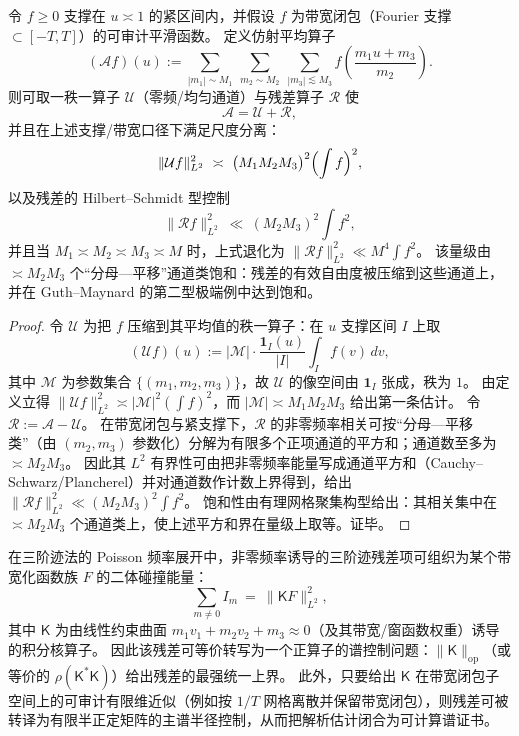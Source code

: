 \begin{proposition}\label{prop:gm-affine-average-rank1-residual}
令 \(f\ge 0\) 支撑在 \(u\asymp 1\) 的紧区间内，并假设 \(f\) 为带宽闭包（Fourier 支撑 \(\subset[-T,T]\)）的可审计平滑函数。
定义仿射平均算子
\[
(\mathcal{A}f)(u)
:=\sum_{|m_1|\sim M_1}\ \sum_{m_2\sim M_2}\ \sum_{|m_3|\lesssim M_3}
f\!\left(\frac{m_1u+m_3}{m_2}\right).
\]
则可取一秩一算子 \(\mathcal{U}\)（零频/均匀通道）与残差算子 \(\mathcal{R}\) 使
\[
\mathcal{A}=\mathcal{U}+\mathcal{R},
\]
并且在上述支撑/带宽口径下满足尺度分离：
\[
\|\mathcal{U}f\|_{L^2}^2\ \asymp\ \bigl(M_1M_2M_3\bigr)^2\Bigl(\int f\Bigr)^2,
\]
以及残差的 Hilbert--Schmidt 型控制
\[
\|\mathcal{R}f\|_{L^2}^2\ \ll\ (M_2M_3)^2\int f^2,
\]
并且当 \(M_1\asymp M_2\asymp M_3\asymp M\) 时，上式退化为 \(\|\mathcal{R}f\|_{L^2}^2\ll M^4\int f^2\)。
该量级由 \(\asymp M_2M_3\) 个“分母—平移”通道类饱和：残差的有效自由度被压缩到这些通道上，并在 Guth--Maynard 的第二型极端例中达到饱和。
\end{proposition}

\begin{proof}
令 \(\mathcal{U}\) 为把 \(f\) 压缩到其平均值的秩一算子：在 \(u\) 支撑区间 \(I\) 上取
\[
(\mathcal{U}f)(u):=\bigl|\mathcal{M}\bigr|\cdot \frac{\mathbf{1}_I(u)}{|I|}\int_I f(v)\,dv,
\]
其中 \(\mathcal{M}\) 为参数集合 \(\{(m_1,m_2,m_3)\}\)，故 \(\mathcal{U}\) 的像空间由 \(\mathbf{1}_I\) 张成，秩为 \(1\)。
由定义立得
\(\|\mathcal{U}f\|_{L^2}^2\asymp |\mathcal{M}|^2(\int f)^2\)，而 \(|\mathcal{M}|\asymp M_1M_2M_3\) 给出第一条估计。
令 \(\mathcal{R}:=\mathcal{A}-\mathcal{U}\)。
在带宽闭包与紧支撑下，\(\mathcal{R}\) 的非零频率相关可按“分母—平移类”（由 \((m_2,m_3)\) 参数化）分解为有限多个正项通道的平方和；通道数至多为 \(\asymp M_2M_3\)。
因此其 \(L^2\) 有界性可由把非零频率能量写成通道平方和（Cauchy--Schwarz/Plancherel）并对通道数作计数上界得到，给出
\(\|\mathcal{R}f\|_{L^2}^2\ll (M_2M_3)^2\int f^2\)。
饱和性由有理网格聚集构型给出：其相关集中在 \(\asymp M_2M_3\) 个通道类上，使上述平方和界在量级上取等。证毕。
\end{proof}

\begin{proposition}\label{prop:gm-trace3-poisson-collision-energy}
在三阶迹法的 Poisson 频率展开中，非零频率诱导的三阶迹残差项可组织为某个带宽化函数族 \(F\) 的二体碰撞能量：
\[
\sum_{m\ne 0} I_m\ =\ \|\mathsf{K}F\|_{L^2}^2,
\]
其中 \(\mathsf{K}\) 为由线性约束曲面 \(m_1v_1+m_2v_2+m_3\approx 0\)（及其带宽/窗函数权重）诱导的积分核算子。
因此该残差可等价转写为一个正算子的谱控制问题：\(\|\mathsf{K}\|_{\mathrm{op}}\)（或等价的 \(\rho(\mathsf{K}^\ast\mathsf{K})\)）给出残差的最强统一上界。
此外，只要给出 \(\mathsf{K}\) 在带宽闭包子空间上的可审计有限维近似（例如按 \(1/T\) 网格离散并保留带宽闭包），则残差可被转译为有限半正定矩阵的主谱半径控制，从而把解析估计闭合为可计算谱证书。
\end{proposition}

